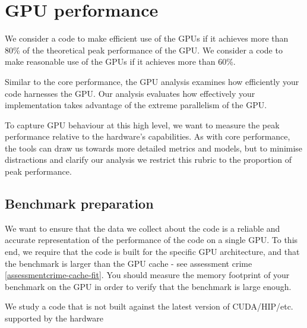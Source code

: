 \section{GPU performance}
\label{section:high-level:gpu}

\begin{summary}
 We consider a code to make efficient use of the GPUs if it 
 achieves more than 80\% of the theoretical peak performance of the GPU. We consider
 a code to make reasonable use of the GPUs if it achieves more than 60\%. 
\end{summary}

Similar to the core performance, the GPU analysis examines how efficiently your code harnesses the GPU.
Our analysis evaluates how effectively your implementation takes advantage of the extreme parallelism of the GPU.

To capture GPU behaviour at this high level, we want to measure the peak performance relative to the hardware's capabilities.
As with core performance, the tools can draw us towards more detailed metrics and models, but to minimise distractions and clarify our analysis we restrict this rubric to the proportion of peak performance.

\subsection{Benchmark preparation}


We want to ensure that the data we collect about the code is a reliable and accurate representation of the performance of the code on a single GPU. To this end, we require that the code is built for the specific GPU architecture, and that the benchmark is larger than the GPU cache - see assessment crime \ref{assessmentcrime-cache-fit}. You should measure the memory footprint of your benchmark on the GPU in order to verify that the benchmark is large enough.

\begin{assessmentcrime}
 We study a code that is not built against the latest version of CUDA/HIP/etc. supported by the hardware
\end{assessmentcrime}


